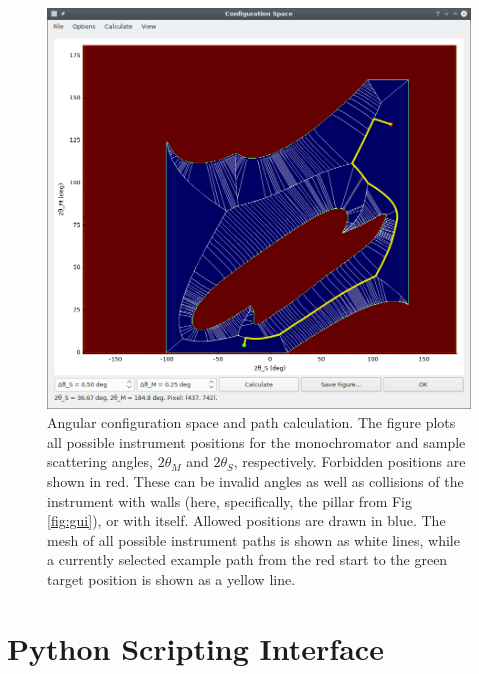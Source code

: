 \begin{figure}[htb]
		\begin{center}
			\includegraphics[width = 0.66 \textwidth]{figures/gui_configspace}
		\end{center}
	\caption{Angular configuration space and path calculation. The figure plots all
	possible instrument positions for the monochromator and sample scattering angles,
	$2\theta_M$ and $2\theta_S$, respectively. Forbidden positions are shown in red.
	These can be invalid angles as well as collisions of the instrument with walls
	(here, specifically, the pillar from Fig \ref{fig:gui}), or with itself.
	Allowed positions are drawn in blue. The mesh of all possible instrument
	paths is shown as white lines, while a currently selected example path from
	the red start to the green target position is shown as a yellow line.
		\label{fig:gui_configspace}}
\end{figure}




\section{Python Scripting Interface}
\label{sec:scripting}
